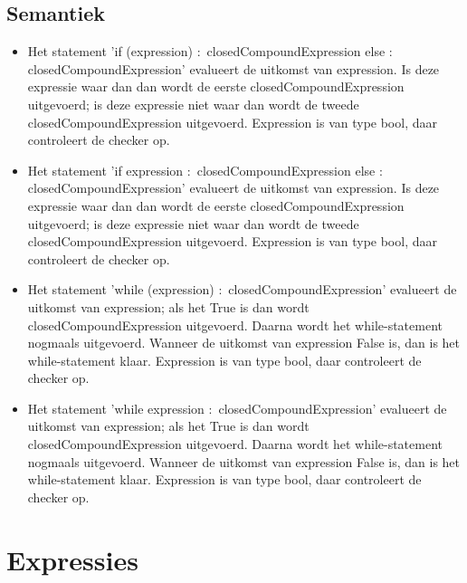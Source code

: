     \subsection{Semantiek}
        \begin{itemize}
        \item Het statement 'if (expression) $\colon$ closedCompoundExpression else $\colon$ closedCompoundExpression' evalueert de uitkomst van expression. Is deze expressie waar dan dan wordt de eerste closedCompoundExpression uitgevoerd; is deze expressie niet waar dan wordt de tweede closedCompoundExpression uitgevoerd. Expression is van type bool, daar controleert de checker op.
        \item Het statement 'if expression $\colon$ closedCompoundExpression else $\colon$ closedCompoundExpression' evalueert de uitkomst van expression. Is deze expressie waar dan dan wordt de eerste closedCompoundExpression uitgevoerd; is deze expressie niet waar dan wordt de tweede closedCompoundExpression uitgevoerd. Expression is van type bool, daar controleert de checker op.
        \item Het statement 'while (expression) $\colon$ closedCompoundExpression' evalueert de uitkomst van expression; als het True is dan wordt closedCompoundExpression uitgevoerd. Daarna wordt het while-statement nogmaals uitgevoerd. Wanneer de uitkomst van expression False is, dan is het while-statement klaar. Expression is van type bool, daar controleert de checker op.
        \item Het statement 'while expression $\colon$ closedCompoundExpression' evalueert de uitkomst van expression; als het True is dan wordt closedCompoundExpression uitgevoerd. Daarna wordt het while-statement nogmaals uitgevoerd. Wanneer de uitkomst van expression False is, dan is het while-statement klaar. Expression is van type bool, daar controleert de checker op.
        \end{itemize}

\section{Expressies}
